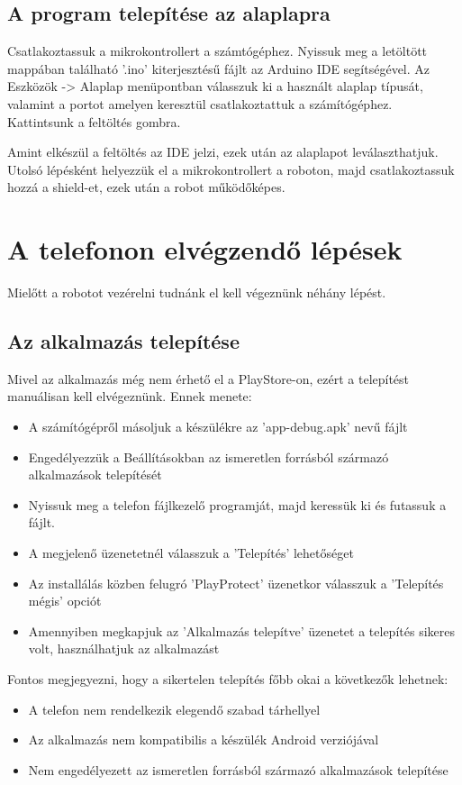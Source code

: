 \documentclass[]{thesis-ekf}
\theoremstyle{definition}
\begin{document}
\subsection{A program telepítése az alaplapra}
Csatlakoztassuk a mikrokontrollert a számtógéphez. Nyissuk meg a letöltött mappában található ’.ino’ kiterjesztésű fájlt az Arduino IDE segítségével. Az Eszközök -> Alaplap menüpontban válasszuk ki a használt alaplap típusát, valamint a portot amelyen keresztül csatlakoztattuk a számítógéphez. Kattintsunk a feltöltés gombra. 

Amint elkészül a feltöltés az IDE jelzi, ezek után az alaplapot leválaszthatjuk. Utolsó lépésként helyezzük el a mikrokontrollert a roboton, majd csatlakoztassuk hozzá a shield-et, ezek után a robot működőképes.
\section{A telefonon elvégzendő lépések}
Mielőtt a robotot vezérelni tudnánk el kell végeznünk néhány lépést.
\subsection{Az alkalmazás telepítése}
Mivel az alkalmazás még nem érhető el a PlayStore-on, ezért a telepítést manuálisan kell elvégeznünk. Ennek menete:
\begin{itemize}
	\item A számítógépről másoljuk a készülékre az 'app-debug.apk' nevű fájlt
	\item Engedélyezzük a Beállításokban az ismeretlen forrásból származó alkalmazások telepítését
	\item Nyissuk meg a telefon fájlkezelő programját, majd keressük ki és futassuk a fájlt.
	\item A megjelenő üzenetetnél válasszuk a 'Telepítés' lehetőséget
	\item Az installálás közben felugró 'PlayProtect' üzenetkor válasszuk a 'Telepítés mégis' opciót
	\item Amennyiben megkapjuk az 'Alkalmazás telepítve' üzenetet a telepítés sikeres volt, használhatjuk az alkalmazást
\end{itemize}

Fontos megjegyezni, hogy a sikertelen telepítés főbb okai a következők lehetnek:
\begin{itemize}
	\item A telefon nem rendelkezik elegendő szabad tárhellyel
	\item Az alkalmazás nem kompatibilis a készülék Android verziójával
	\item Nem engedélyezett az ismeretlen forrásból származó alkalmazások telepítése
\end{itemize}
\end{document}
